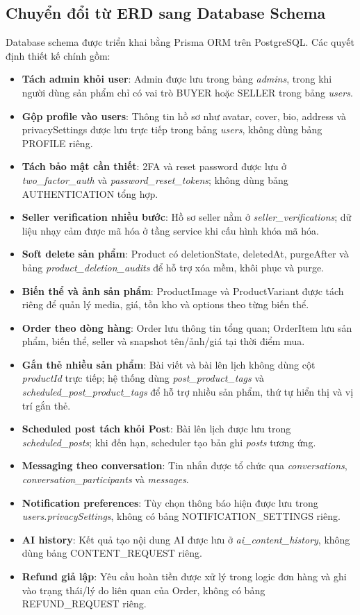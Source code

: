 \subsection{Chuyển đổi từ ERD sang Database Schema}

Database schema được triển khai bằng Prisma ORM trên PostgreSQL. Các quyết định thiết kế chính gồm:

\begin{itemize}
  \item \textbf{Tách admin khỏi user}: Admin được lưu trong bảng \textit{admins}, trong khi người dùng sản phẩm chỉ có vai trò BUYER hoặc SELLER trong bảng \textit{users}.
  \item \textbf{Gộp profile vào users}: Thông tin hồ sơ như avatar, cover, bio, address và privacySettings được lưu trực tiếp trong bảng \textit{users}, không dùng bảng PROFILE riêng.
  \item \textbf{Tách bảo mật cần thiết}: 2FA và reset password được lưu ở \textit{two\_factor\_auth} và \textit{password\_reset\_tokens}; không dùng bảng AUTHENTICATION tổng hợp.
  \item \textbf{Seller verification nhiều bước}: Hồ sơ seller nằm ở \textit{seller\_verifications}; dữ liệu nhạy cảm được mã hóa ở tầng service khi cấu hình khóa mã hóa.
  \item \textbf{Soft delete sản phẩm}: Product có deletionState, deletedAt, purgeAfter và bảng \textit{product\_deletion\_audits} để hỗ trợ xóa mềm, khôi phục và purge.
  \item \textbf{Biến thể và ảnh sản phẩm}: ProductImage và ProductVariant được tách riêng để quản lý media, giá, tồn kho và options theo từng biến thể.
  \item \textbf{Order theo dòng hàng}: Order lưu thông tin tổng quan; OrderItem lưu sản phẩm, biến thể, seller và snapshot tên/ảnh/giá tại thời điểm mua.
  \item \textbf{Gắn thẻ nhiều sản phẩm}: Bài viết và bài lên lịch không dùng cột \textit{productId} trực tiếp; hệ thống dùng \textit{post\_product\_tags} và \textit{scheduled\_post\_product\_tags} để hỗ trợ nhiều sản phẩm, thứ tự hiển thị và vị trí gắn thẻ.
  \item \textbf{Scheduled post tách khỏi Post}: Bài lên lịch được lưu trong \textit{scheduled\_posts}; khi đến hạn, scheduler tạo bản ghi \textit{posts} tương ứng.
  \item \textbf{Messaging theo conversation}: Tin nhắn được tổ chức qua \textit{conversations}, \textit{conversation\_participants} và \textit{messages}.
  \item \textbf{Notification preferences}: Tùy chọn thông báo hiện được lưu trong \textit{users.privacySettings}, không có bảng NOTIFICATION\_SETTINGS riêng.
  \item \textbf{AI history}: Kết quả tạo nội dung AI được lưu ở \textit{ai\_content\_history}, không dùng bảng CONTENT\_REQUEST riêng.
  \item \textbf{Refund giả lập}: Yêu cầu hoàn tiền được xử lý trong logic đơn hàng và ghi vào trạng thái/lý do liên quan của Order, không có bảng REFUND\_REQUEST riêng.
\end{itemize}
